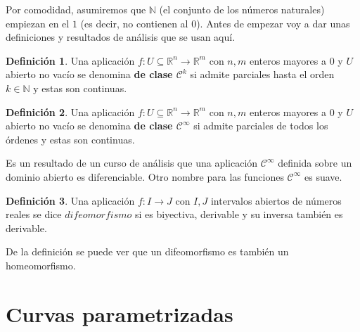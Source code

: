 \documentclass{article}
\author{NyKi}
\date{Enero 2025-}
\theoremstyle{definition}
\newtheorem{define}{Definición}
\newcommand{\reales}{\mathbb{R}}
\newcommand{\naturales}{\mathbb{N}}
\newcommand{\cinfinito}{\mathcal{C}^{\infty}}
\newcommand{\claseck}[1]{\mathcal{C}^{#1}}
\begin{document}
Por comodidad, asumiremos que $\naturales$ (el conjunto de los números naturales) empiezan en el $1$ (es decir, no contienen al $0$).
Antes de empezar voy a dar unas definiciones y resultados de análisis que se usan aquí.

\begin{define}
	Una aplicación $f:U\subseteq\reales^n \rightarrow \reales^m$ con $n,m$ enteros mayores a 0 y $U$ abierto no vacío se denomina \textbf{de clase $\claseck{k}$} si admite parciales hasta el orden $k \in \naturales$ y estas son continuas.
\end{define}
\begin{define}
	Una aplicación $f:U\subseteq\reales^n \rightarrow \reales^m$ con $n,m$ enteros mayores a 0 y $U$ abierto no vacío se denomina \textbf{de clase $\cinfinito$} si admite parciales de todos los órdenes y estas son continuas.
\end{define}
Es un resultado de un curso de análisis que una aplicación $\cinfinito$ definida sobre un dominio abierto es diferenciable. Otro nombre para las funciones $\cinfinito$ es suave.
\begin{define}
	Una aplicación $f:I \rightarrow J$ con $I,J$ intervalos abiertos de números reales se dice $difeomorfismo$ si es biyectiva, derivable y su inversa también es derivable.
\end{define}
De la definición se puede ver que un difeomorfismo es también un homeomorfismo.

\section{Curvas parametrizadas}
\end{document}
